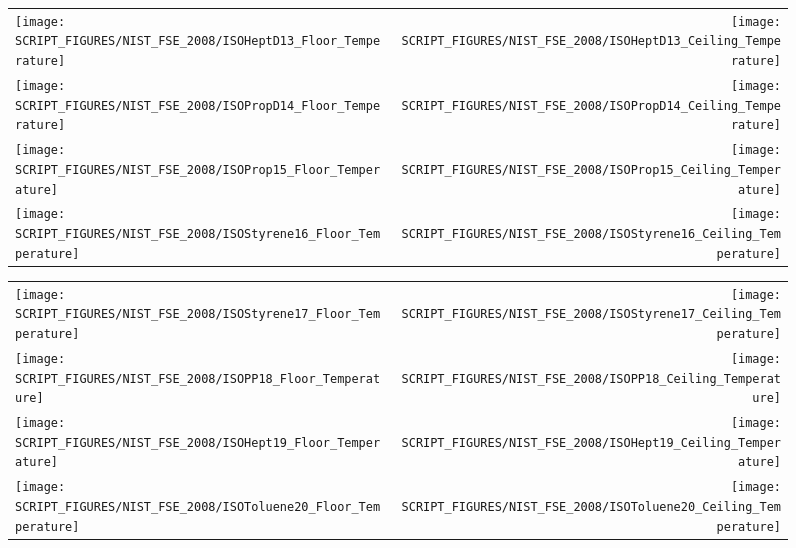 \begin{figure}[p]
\begin{tabular*}{\textwidth}{l@{\extracolsep{\fill}}r}
\texttt{[image: SCRIPT\_FIGURES/NIST\_FSE\_2008/ISOHeptD13\_Floor\_Temperature]} &
\texttt{[image: SCRIPT\_FIGURES/NIST\_FSE\_2008/ISOHeptD13\_Ceiling\_Temperature]} \\
\texttt{[image: SCRIPT\_FIGURES/NIST\_FSE\_2008/ISOPropD14\_Floor\_Temperature]} &
\texttt{[image: SCRIPT\_FIGURES/NIST\_FSE\_2008/ISOPropD14\_Ceiling\_Temperature]} \\
\texttt{[image: SCRIPT\_FIGURES/NIST\_FSE\_2008/ISOProp15\_Floor\_Temperature]} &
\texttt{[image: SCRIPT\_FIGURES/NIST\_FSE\_2008/ISOProp15\_Ceiling\_Temperature]} \\
\texttt{[image: SCRIPT\_FIGURES/NIST\_FSE\_2008/ISOStyrene16\_Floor\_Temperature]} &
\texttt{[image: SCRIPT\_FIGURES/NIST\_FSE\_2008/ISOStyrene16\_Ceiling\_Temperature]}
\end{tabular*}
\label{NIST_FSE_2008_Surface_Temp_3}
\end{figure}

\begin{figure}[p]
\begin{tabular*}{\textwidth}{l@{\extracolsep{\fill}}r}
\texttt{[image: SCRIPT\_FIGURES/NIST\_FSE\_2008/ISOStyrene17\_Floor\_Temperature]} &
\texttt{[image: SCRIPT\_FIGURES/NIST\_FSE\_2008/ISOStyrene17\_Ceiling\_Temperature]} \\
\texttt{[image: SCRIPT\_FIGURES/NIST\_FSE\_2008/ISOPP18\_Floor\_Temperature]} &
\texttt{[image: SCRIPT\_FIGURES/NIST\_FSE\_2008/ISOPP18\_Ceiling\_Temperature]} \\
\texttt{[image: SCRIPT\_FIGURES/NIST\_FSE\_2008/ISOHept19\_Floor\_Temperature]} &
\texttt{[image: SCRIPT\_FIGURES/NIST\_FSE\_2008/ISOHept19\_Ceiling\_Temperature]} \\
\texttt{[image: SCRIPT\_FIGURES/NIST\_FSE\_2008/ISOToluene20\_Floor\_Temperature]} &
\texttt{[image: SCRIPT\_FIGURES/NIST\_FSE\_2008/ISOToluene20\_Ceiling\_Temperature]}
\end{tabular*}
\label{NIST_FSE_2008_Surface_Temp_4}
\end{figure}


